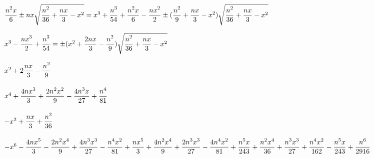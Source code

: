 ${\displaystyle\strut {n^{2}x}\over \displaystyle\strut 6} \pm  nx\sqrt{{\displaystyle\strut n^{2}\over \displaystyle\strut 36} + {\displaystyle\strut {nx}\over \displaystyle\strut 3} - x^{2}}= x^{3} + {\displaystyle\strut n^{3}\over \displaystyle\strut 54} + {\displaystyle\strut {n^{2}x}\over \displaystyle\strut 6} - {\displaystyle\strut {nx^{2}}\over \displaystyle\strut 2} \pm  ({\displaystyle\strut n^{2}\over \displaystyle\strut 9} + {\displaystyle\strut {nx}\over \displaystyle\strut 3} - x^{2})\sqrt{{\displaystyle\strut n^{2}\over \displaystyle\strut 36} + {\displaystyle\strut {nx}\over \displaystyle\strut 3} - x^{2}}$\par\vfill\eject
$x^{3} - {\displaystyle\strut {nx^{3}}\over \displaystyle\strut 2} + {\displaystyle\strut n^{3}\over \displaystyle\strut 54} = \pm  (x^{2} + {\displaystyle\strut {2nx}\over \displaystyle\strut 3} - {\displaystyle\strut n^{2}\over \displaystyle\strut 9})\sqrt{{\displaystyle\strut n^{2}\over \displaystyle\strut 36} + {\displaystyle\strut {nx}\over \displaystyle\strut 3} - x^{2}}$\par\vfill\eject
$x^{2} + 2{\displaystyle\strut {nx}\over \displaystyle\strut 3} - {\displaystyle\strut n^{2}\over \displaystyle\strut 9}$\par\vfill\eject
$x^{4} + {\displaystyle\strut {4nx^{3}}\over \displaystyle\strut 3} + {\displaystyle\strut {2n^{2}x^{2}}\over \displaystyle\strut 9} - {\displaystyle\strut {4n^{3}x}\over \displaystyle\strut 27} + {\displaystyle\strut n^{4}\over \displaystyle\strut 81}$\par\vfill\eject
$- x^{2} + {\displaystyle\strut {nx}\over \displaystyle\strut 3} + {\displaystyle\strut n^{2}\over \displaystyle\strut 36}$\par\vfill\eject
$- x^{6} - {\displaystyle\strut {4nx^{5}}\over \displaystyle\strut 3} - {\displaystyle\strut {2n^{2}x^{4}}\over \displaystyle\strut 9} + {\displaystyle\strut {4n^{3}x^{3}}\over \displaystyle\strut 27} - {\displaystyle\strut {n^{4}x^{2}}\over \displaystyle\strut 81} + {\displaystyle\strut {nx^{5}}\over \displaystyle\strut 3} + {\displaystyle\strut {4n^{2}x^{4}}\over \displaystyle\strut 9} + {\displaystyle\strut {2n^{3}x^{3}}\over \displaystyle\strut 27} - {\displaystyle\strut {4n^{4}x^{2}}\over \displaystyle\strut 81} + {\displaystyle\strut {n^{5}x}\over \displaystyle\strut 243} + {\displaystyle\strut {n^{2}x^{4}}\over \displaystyle\strut 36} + {\displaystyle\strut {n^{3}x^{3}}\over \displaystyle\strut 27} + {\displaystyle\strut {n^{4}x^{2}}\over \displaystyle\strut 162} - {\displaystyle\strut {n^{5}x}\over \displaystyle\strut 243} + {\displaystyle\strut n^{6}\over \displaystyle\strut 2916}$\par\vfill\eject
